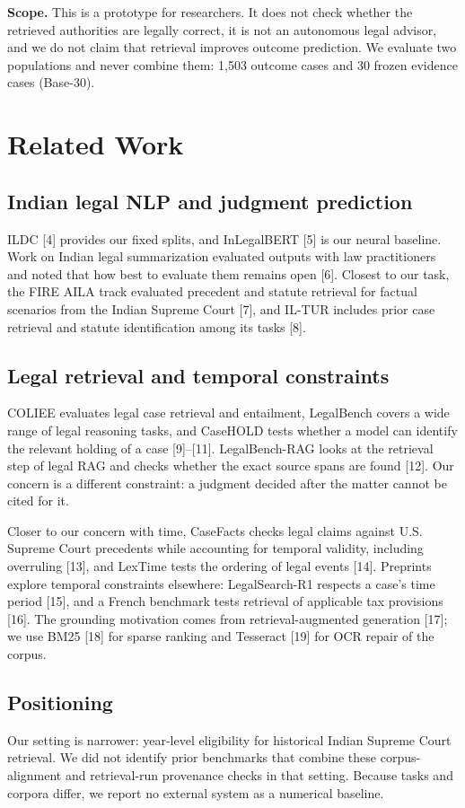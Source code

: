 \documentclass[conference]{IEEEtran}
\begin{document}
\textbf{Scope.} This is a prototype for researchers. It does not check whether the retrieved authorities are legally correct, it is not an autonomous legal advisor, and we do not claim that retrieval improves outcome prediction. We evaluate two populations and never combine them: 1,503 outcome cases and 30 frozen evidence cases (Base-30).

\section{Related Work}
\subsection{Indian legal NLP and judgment prediction}
ILDC [4] provides our fixed splits, and InLegalBERT [5] is our neural baseline. Work on Indian legal summarization evaluated outputs with law practitioners and noted that how best to evaluate them remains open [6]. Closest to our task, the FIRE AILA track evaluated precedent and statute retrieval for factual scenarios from the Indian Supreme Court [7], and IL-TUR includes prior case retrieval and statute identification among its tasks [8].

\subsection{Legal retrieval and temporal constraints}
COLIEE evaluates legal case retrieval and entailment, LegalBench covers a wide range of legal reasoning tasks, and CaseHOLD tests whether a model can identify the relevant holding of a case [9]--[11]. LegalBench-RAG looks at the retrieval step of legal RAG and checks whether the exact source spans are found [12]. Our concern is a different constraint: a judgment decided after the matter cannot be cited for it.

Closer to our concern with time, CaseFacts checks legal claims against U.S. Supreme Court precedents while accounting for temporal validity, including overruling [13], and LexTime tests the ordering of legal events [14]. Preprints explore temporal constraints elsewhere: LegalSearch-R1 respects a case's time period [15], and a French benchmark tests retrieval of applicable tax provisions [16]. The grounding motivation comes from retrieval-augmented generation [17]; we use BM25 [18] for sparse ranking and Tesseract [19] for OCR repair of the corpus.

\subsection{Positioning}
Our setting is narrower: year-level eligibility for historical Indian Supreme Court retrieval. We did not identify prior benchmarks that combine these corpus-alignment and retrieval-run provenance checks in that setting. Because tasks and corpora differ, we report no external system as a numerical baseline.
\end{document}
